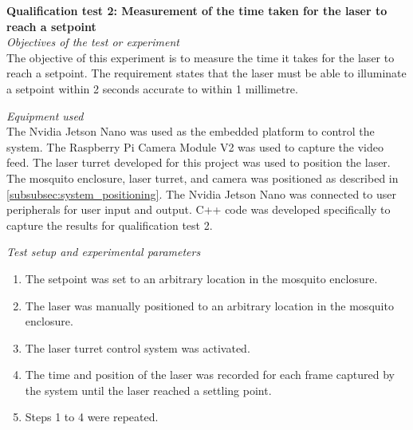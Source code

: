 \FloatBarrier
\textbf{Qualification test 2: Measurement of the time taken for the laser to reach a setpoint}\\

\textit{Objectives of the test or experiment}\\
The objective of this experiment is to measure the time it takes for the laser to reach a setpoint. The requirement states that the laser must be able to illuminate a setpoint within 2 seconds accurate to within 1 millimetre.

\textit{Equipment used}\\
The Nvidia Jetson Nano was used as the embedded platform to control the system. The Raspberry Pi Camera Module V2 was used to capture the video feed. The laser turret developed for this project was used to position the laser. The mosquito enclosure, laser turret, and camera was positioned as described in \autoref{subsubsec:system_positioning}. The Nvidia Jetson Nano was connected to user peripherals for user input and output. C++ code was developed specifically to capture the results for qualification test 2.

\textit{Test setup and experimental parameters}
\begin{enumerate}
  \item The setpoint was set to an arbitrary location in the mosquito enclosure.
  \item The laser was manually positioned to an arbitrary location in the mosquito enclosure.
  \item The laser turret control system was activated.
  \item The time and position of the laser was recorded for each frame captured by the system until the laser reached a settling point.
  \item Steps 1 to 4 were repeated.
\end{enumerate}

